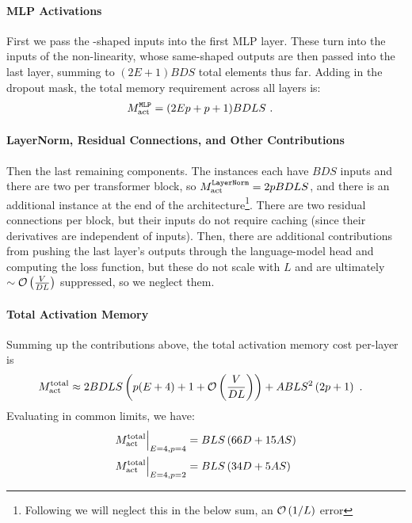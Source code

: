 \documentclass[11pt]{article}
\begin{document}
\paragraph{MLP Activations}

First we pass the -shaped inputs into the first MLP layer. These turn into the
 inputs of the non-linearity, whose same-shaped outputs are then passed into
the last  layer, summing to $ (2E+1)BDS $ total elements thus far. Adding in the
dropout mask, the total memory requirement across all  layers is:
\begin{align}
	M _{ \rm act  } ^\texttt{MLP} & = (2Ep+p+1)BDLS\ .
	\label{eq_mlp_actmem_vanilla}
\end{align}




\paragraph{LayerNorm, Residual Connections, and Other Contributions}

Then the last remaining components. The  instances each have $ BDS $ inputs and
there are two per transformer block, so $ M _{ {\rm  act}  } ^\texttt{LayerNorm} = 2pBDLS $, and
there is an additional instance at the end of the architecture\footnote{Following
\cite{korthikanti2022reducing} we will neglect this in the below sum, an $ \mathcal{O} \left( 1/L
\right) $ error}. There are two residual connections per block, but their inputs do not require
caching (since their derivatives are independent of inputs). Then, there are additional
contributions from pushing the last layer's outputs through the language-model head and
computing the loss function, but these do not scale with $ L $ and are ultimately $ \sim \mathcal{O}
\left( \frac{ V }{ DL } \right)  $ suppressed, so we neglect them.





\paragraph{Total Activation Memory}


Summing up the contributions above, the total activation memory cost per-layer is
\begin{align}
	M _{ {\rm act}  } ^{ {\rm  total}  } & \approx  2BDLS   \left ( p(E+4) + 1 + \mathcal{O} \left( \frac{
		V}{ DL } \right)  \right )
	+ ABLS ^{ 2 } \left ( 2p+1\right ) \label{eq_act_mem_total_no_sharding}\ .
\end{align}
Evaluating in common limits, we have:
\begin{align}
	M _{ {\rm act}  } ^{ {\rm  total}  } \Big| _{ E=4, p=4 } & =BLS \left ( 66 D+15AS  \right ) \nonumber\\
	M _{ {\rm act}  } ^{ {\rm  total}  } \Big| _{ E=4, p=2 } & =BLS \left ( 34 D+5AS  \right )
\end{align}
\end{document}
